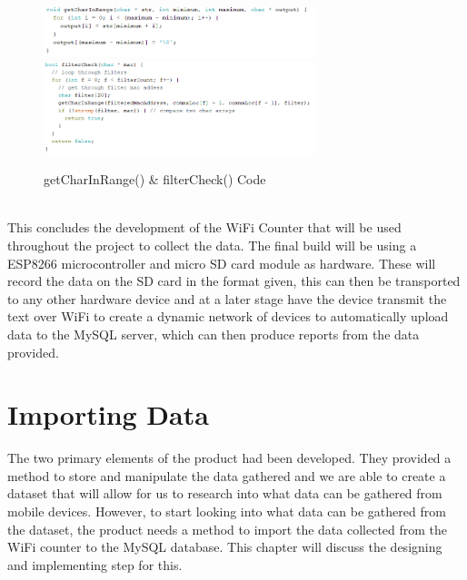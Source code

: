 \documentclass{report}
\begin{document}
\begin{figure}[h!]
    \centering
    \includegraphics[width=300]{charRange.PNG} 
    \includegraphics[width=300]{filterCheck.PNG}
    \caption{getCharInRange() & filterCheck() Code}
    \label{fig:charRange_filterCheck}
\end{figure} \\
This concludes the development of the WiFi Counter that will be used throughout the project to collect the data. The final build will be using a ESP8266 microcontroller and micro SD card module as hardware. These will record the data on the SD card in the format given, this can then be transported to any other hardware device and at a later stage have the device transmit the text over WiFi to create a dynamic network of devices to automatically upload data to the MySQL server, which can then produce reports from the data provided.\\ \newline

\clearpage


\section{Importing Data}
The two primary elements of the product had been developed. They provided a method to store and manipulate the data gathered and we are able to create a dataset that will allow for us to research into what data can be gathered from mobile devices. However, to start looking into what data can be gathered from the dataset, the product needs a method to import the data collected from the WiFi counter to the MySQL database. This chapter will discuss the designing and implementing step for this. 
\end{document}
